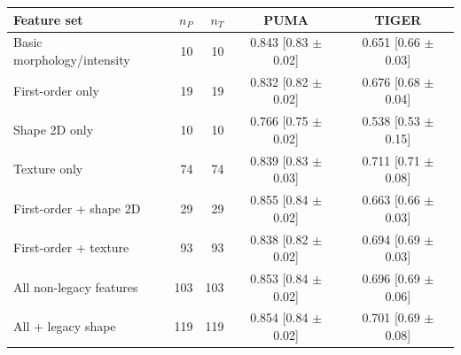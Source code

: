 \begin{tabular}{lrrcc}
\toprule
Feature set & $n_P$ & $n_T$ & PUMA & TIGER \\
\midrule
Basic morphology/intensity & 10 & 10 & 0.843 [0.83 $\pm$ 0.02] & 0.651 [0.66 $\pm$ 0.03] \\
First-order only & 19 & 19 & 0.832 [0.82 $\pm$ 0.02] & 0.676 [0.68 $\pm$ 0.04] \\
Shape 2D only & 10 & 10 & 0.766 [0.75 $\pm$ 0.02] & 0.538 [0.53 $\pm$ 0.15] \\
Texture only & 74 & 74 & 0.839 [0.83 $\pm$ 0.03] & 0.711 [0.71 $\pm$ 0.08] \\
First-order + shape 2D & 29 & 29 & 0.855 [0.84 $\pm$ 0.02] & 0.663 [0.66 $\pm$ 0.03] \\
First-order + texture & 93 & 93 & 0.838 [0.82 $\pm$ 0.02] & 0.694 [0.69 $\pm$ 0.03] \\
All non-legacy features & 103 & 103 & 0.853 [0.84 $\pm$ 0.02] & 0.696 [0.69 $\pm$ 0.06] \\
All + legacy shape & 119 & 119 & 0.854 [0.84 $\pm$ 0.02] & 0.701 [0.69 $\pm$ 0.08] \\
\bottomrule
\end{tabular}
